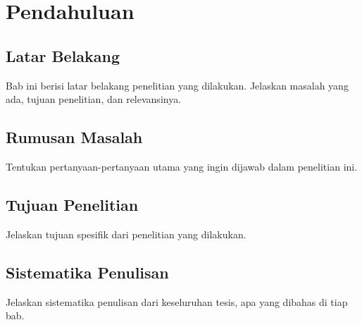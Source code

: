 \chapter{Pendahuluan}
\section{Latar Belakang}
Bab ini berisi latar belakang penelitian yang dilakukan. Jelaskan masalah yang ada, tujuan penelitian, dan relevansinya.

\section{Rumusan Masalah}
Tentukan pertanyaan-pertanyaan utama yang ingin dijawab dalam penelitian ini.

\section{Tujuan Penelitian}
Jelaskan tujuan spesifik dari penelitian yang dilakukan.

\section{Sistematika Penulisan}
Jelaskan sistematika penulisan dari keseluruhan tesis, apa yang dibahas di tiap bab.